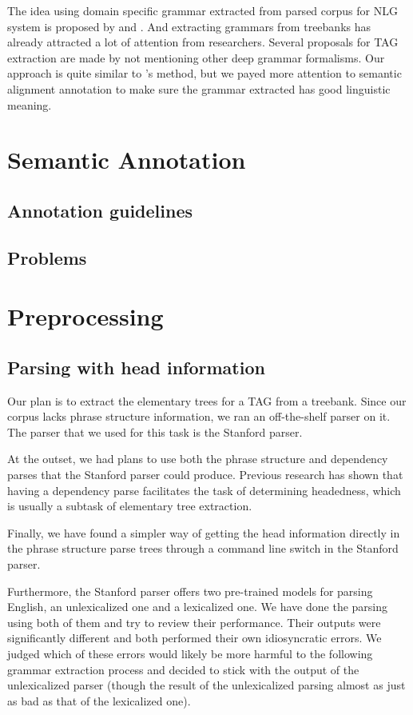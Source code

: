 \documentclass[a4paper]{article}
\begin{document}
The idea using domain specific grammar extracted from parsed corpus for NLG system is proposed by \citet{DeVault2008a} and \citet{DeVault2008}. And extracting grammars from treebanks has already attracted a lot of attention from researchers. Several proposals for TAG extraction are made by \citet{Xia2001,Xia1999,Xia2006,Chen} not mentioning other deep grammar formalisms. Our approach is quite similar to \citet{DeVault2008a}'s method, but we payed more attention to semantic alignment annotation to make sure the grammar extracted has good linguistic meaning.
\section{Semantic Annotation}
\label{sec:sem-annot}
\subsection{Annotation guidelines}
\subsection{Problems}


\section{Preprocessing}

\subsection{Parsing with head information}

Our plan is to extract the elementary trees for a TAG from a treebank.
Since our corpus lacks phrase structure information, we ran an
off-the-shelf parser on it. The parser that we used for this task is
the Stanford parser.

At the outset, we had plans to use both the phrase structure and
dependency parses that the Stanford parser could produce. Previous
research has shown that having a dependency parse facilitates the task
of determining headedness, which is usually a subtask of elementary
tree extraction.

Finally, we have found a simpler way of getting the head information
directly in the phrase structure parse trees through a command line
switch in the Stanford parser.


Furthermore, the Stanford parser offers two pre-trained models for
parsing English, an unlexicalized one and a lexicalized one. We have
done the parsing using both of them and try to review their
performance. Their outputs were significantly different and both
performed their own idiosyncratic errors. We judged which of these
errors would likely be more harmful to the following grammar
extraction process and decided to stick with the output of the
unlexicalized parser (though the result of the unlexicalized parsing
almost as just as bad as that of the lexicalized one).
\end{document}

